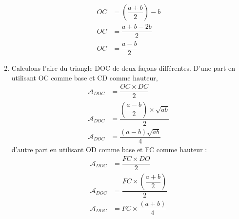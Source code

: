 \documentclass[11pt]{article}
\begin{document}
\begin{enumerate}
\begin{align*}
	OC &= \left( \dfrac{a + b}{2} \right) - b\\
	OC &= \dfrac{a + b - 2b}{2}\\
	OC &= \dfrac{a - b}{2}
\end{align*}
\item Calculons l'aire du triangle DOC de deux façons différentes. 
D'une part en utilisant OC comme base et CD comme hauteur, 
\begin{align*}
	\mathcal{A}_{DOC} &= \dfrac{OC\times DC}{2}\\
	\mathcal{A}_{DOC} &= \dfrac{\left(\dfrac{a - b}{2}\right)\times \sqrt{ab}}{2} \\
	\mathcal{A}_{DOC} &= \dfrac{(a - b)\sqrt{ab}}{4}
\end{align*}
d'autre part en utilisant OD comme base et FC comme hauteur :
\begin{align*}
	\mathcal{A}_{DOC} &= \dfrac{FC\times DO}{2}\\
	\mathcal{A}_{DOC} &= \dfrac{FC\times \left(\dfrac{a + b}{2}\right)}{2} \\
	\mathcal{A}_{DOC} &= FC\times \dfrac{(a + b)}{4}
\end{align*}


\end{enumerate}
\end{document}
